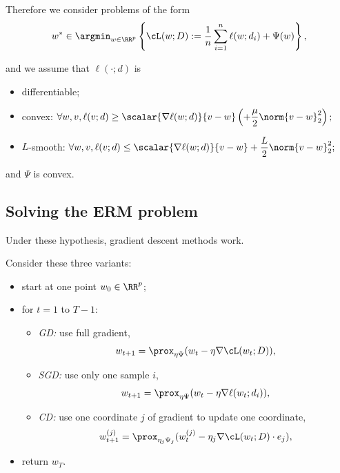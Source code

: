 \documentclass[notheorems]{beamer}
\begin{document}
\begin{frame}
  Therefore we consider problems of the form
  \begin{align}
    w^* \in \argmin_{w \in \RR^p} \left\{ \cL(w; D) := \frac 1n \sum_{i=1}^n \ell(w; d_i) + \Psi(w) \right\},
  \end{align}

  and we assume that $\ell(\cdot; d)$ is
  \begin{itemize}
  \item differentiable;
  \item convex:
    $\displaystyle \forall w, v, \ell(v; d) \ge \scalar{\nabla \ell(w; d)}{v - w} \left(+ \frac \mu 2 \norm{v - w}_2^2\right);$
  \item $L$-smooth:
    $\displaystyle\forall w, v, \ell(v; d) \le \scalar{\nabla \ell(w; d)}{v - w} + \frac L 2 \norm{v - w}_2^2;$
  \end{itemize}

  and $\Psi$ is convex.
\end{frame}

\subsection{Solving the ERM problem}
\label{sub:solving_the_erm_problem}



\begin{frame}
  Under these hypothesis, gradient descent methods work.

  Consider these three variants:
  \begin{itemize}
  \item start at one point $w_0 \in \RR^p$;
  \item for $t = 1$ to $T-1$:
    \begin{itemize}
    \item \textit{GD:} use full gradient,
      $$w_{t+1} = \prox_{\eta \Psi}(w_t - \eta \nabla \cL(w_t; D)),$$
    \item \textit{SGD:} use only one sample $i$,
      $$w_{t+1} = \prox_{\eta \Psi}(w_t - \eta \nabla \ell(w_t; d_i)),$$
    \item \textit{CD:} use one coordinate $j$ of gradient to update one coordinate,
      $$w_{t+1}^{(j)} = \prox_{\eta_j \Psi_j}(w_t^{(j)} - \eta_j \nabla \cL(w_t; D) \cdot e_j), $$
    \end{itemize}
  \item return $w_{T}$.
  \end{itemize}
\end{frame}
\end{document}
